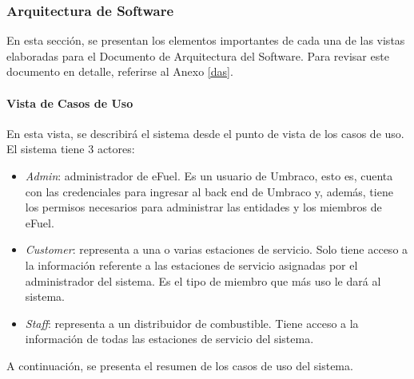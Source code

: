 \subsubsection{Arquitectura de Software}
En esta sección, se presentan los elementos importantes de cada una de las vistas elaboradas para el Documento de Arquitectura del Software. Para revisar este documento en detalle, referirse al Anexo \ref{das}.

\paragraph{Vista de Casos de Uso} En esta vista, se describirá el sistema desde el punto de vista de los casos de uso. El sistema tiene 3 actores:

\begin{itemize}
    \item \emph{Admin}: administrador de eFuel. Es un usuario de Umbraco, esto es, cuenta con las credenciales para ingresar al back end de Umbraco y, además, tiene los permisos necesarios para administrar las entidades y los miembros de eFuel.
    \item \emph{Customer}: representa a una o varias estaciones de servicio. Solo tiene acceso a la información referente a las estaciones de servicio asignadas por el administrador del sistema. Es el tipo de miembro que más uso le dará al sistema.
    \item \emph{Staff}: representa a un distribuidor de combustible. Tiene acceso a la información de todas las estaciones de servicio del sistema.
\end{itemize}

A continuación, se presenta el resumen de los casos de uso del sistema.

\newcommand\rownumber{\stepcounter{magicrownumbers}\arabic{magicrownumbers}}

